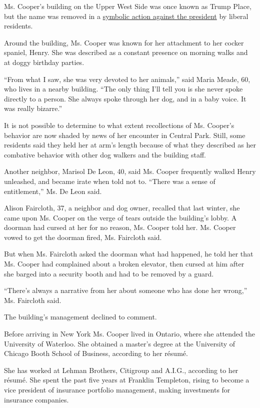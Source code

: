 Ms. Cooper's building on the Upper West Side was once known as Trump
Place, but the name was removed in a
\href{https://www.nytimes3xbfgragh.onion/2016/10/25/nyregion/trump-place-buildings-name-change.html}{symbolic
action against the president} by liberal residents.

Around the building, Ms. Cooper was known for her attachment to her
cocker spaniel, Henry. She was described as a constant presence on
morning walks and at doggy birthday parties.

``From what I saw, she was very devoted to her animals,'' said Maria
Meade, 60, who lives in a nearby building. ``The only thing I'll tell
you is she never spoke directly to a person. She always spoke through
her dog, and in a baby voice. It was really bizarre.''

It is not possible to determine to what extent recollections of Ms.
Cooper's behavior are now shaded by news of her encounter in Central
Park. Still, some residents said they held her at arm's length because
of what they described as her combative behavior with other dog walkers
and the building staff.

Another neighbor, Marisol De Leon, 40, said Ms. Cooper frequently walked
Henry unleashed, and became irate when told not to. ``There was a sense
of entitlement,'' Ms. De Leon said.

Alison Faircloth, 37, a neighbor and dog owner, recalled that last
winter, she came upon Ms. Cooper on the verge of tears outside the
building's lobby. A doorman had cursed at her for no reason, Ms. Cooper
told her. Ms. Cooper vowed to get the doorman fired, Ms. Faircloth said.

But when Ms. Faircloth asked the doorman what had happened, he told her
that Ms. Cooper had complained about a broken elevator, then cursed at
him after she barged into a security booth and had to be removed by a
guard.

``There's always a narrative from her about someone who has done her
wrong,'' Ms. Faircloth said.

The building's management declined to comment.

Before arriving in New York Ms. Cooper lived in Ontario, where she
attended the University of Waterloo. She obtained a master's degree at
the University of Chicago Booth School of Business, according to her
résumé.

She has worked at Lehman Brothers, Citigroup and A.I.G., according to
her résumé. She spent the past five years at Franklin Templeton, rising
to become a vice president of insurance portfolio management, making
investments for insurance companies.

